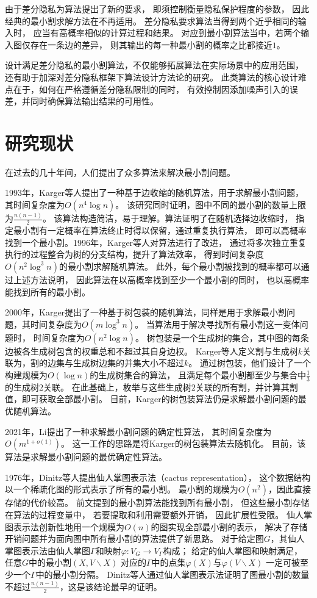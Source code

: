由于差分隐私为算法提出了新的要求，
即须控制衡量隐私保护程度的参数，
因此经典的最小割求解方法在不再适用。
差分隐私要求算法当得到两个近乎相同的输入时，
应当有高概率相似的计算过程和结果。
对应到最小割算法当中，若两个输入图仅存在一条边的差异，
则其输出的每一种最小割的概率之比都接近$1$。

设计满足差分隐私的最小割算法，不仅能够拓展算法在实际场景中的应用范围，
还有助于加深对差分隐私框架下算法设计方法论的研究。
此类算法的核心设计难点在于，如何在严格遵循差分隐私限制的同时，
有效控制因添加噪声引入的误差，并同时确保算法输出结果的可用性。

\section{研究现状}

在过去的几十年间，人们提出了众多算法来解决最小割问题。

1993年，Karger等人提出了一种基于边收缩的随机算法，用于求解最小割问题，其时间复杂度为$O(n^4\log n)$。
该研究同时证明，图中不同的最小割的数量上限为$\frac{n(n-1)}2$。\cite{karger1993global}
该算法构造简洁，易于理解。算法证明了在随机选择边收缩时，
指定最小割有一定概率在算法终止时得以保留，通过重复执行算法，
即可以高概率找到一个最小割。1996年，Karger等人对算法进行了改进，
通过将多次独立重复执行的过程整合为树的分支结构，提升了算法效率，
得到时间复杂度$O(n^2\log^3 n)$的最小割求解随机算法。\cite{karger1996new}
此外，每个最小割被找到的概率都可以通过上述方法说明，
因此算法在以高概率找到至少一个最小割的同时，
也以高概率能找到所有的最小割。

2000年，Karger提出了一种基于树包装的随机算法，同样是用于求解最小割问题，其时间复杂度为$ O(m\log^3n)$。\cite{karger2000minimum}
当算法用于解决寻找所有最小割这一变体问题时，
时间复杂度为$O(n^2\log n)$。
树包装是一个生成树的集合，其中图的每条边被各生成树包含的权重总和不超过其自身边权。
Karger等人定义割与生成树$k$关联为，割的边集与生成树边集的并集大小不超过$k$。
通过树包装，他们设计了一个构建规模为$O(\log n)$的生成树集合的算法，
且满足每个最小割都至少与集合中$\frac13$的生成树$2$关联。
在此基础上，枚举与这些生成树$2$关联的所有割，并计算其割值，即可获取全部最小割。
目前，Karger的树包装算法仍是求解最小割问题的最优随机算法。

2021年，Li提出了一种求解最小割问题的确定性算法，
其时间复杂度为$O(m^{1+o(1)})$。\cite{li2021deterministic}
这一工作的思路是将Karger的树包装算法去随机化。
目前，该算法是求解最小割问题的最优确定性算法。

1976年，Dinitz等人提出仙人掌图表示法（cactus representation），
这个数据结构以一个稀疏化图的形式表示了所有的最小割。\cite{dinitz1976structure}\cite{fleiner2009quick}
最小割的规模为$O(n^2)$，因此直接存储的代价较高。
前文提到的最小割算法能找到所有最小割，
但这些最小割存储在算法的过程变量中，
若要提取和利用需要额外开销，
因此扩展性受限。
仙人掌图表示法创新性地用一个规模为$O(n)$的图实现全部最小割的表示，
解决了存储开销问题并为面向图中所有最小割的算法提供了新思路。
对于给定图$G$，其仙人掌图表示法由仙人掌图$\Gamma$和映射$\varphi:V_G\rightarrow V_\Gamma$构成；
给定的仙人掌图和映射满足，
任意$G$中的最小割$(X,V\backslash X)$
对应的$\Gamma$中的点集$\varphi(X)$与$\varphi(V\backslash X)$
一定可被至少一个$\Gamma$中的最小割分隔。
Dinitz等人通过仙人掌图表示法证明了图最小割的数量不超过$\frac{n(n-1)}2$，这是该结论最早的证明。

